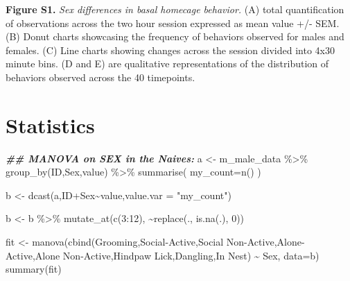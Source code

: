 \documentclass[
]{book}
\newenvironment{Shaded}{\begin{snugshade}}{\end{snugshade}}
\newcommand{\AttributeTok}[1]{\textcolor[rgb]{0.77,0.63,0.00}{#1}}
\newcommand{\DecValTok}[1]{\textcolor[rgb]{0.00,0.00,0.81}{#1}}
\newcommand{\DocumentationTok}[1]{\textcolor[rgb]{0.56,0.35,0.01}{\textbf{\textit{#1}}}}
\newcommand{\FunctionTok}[1]{\textcolor[rgb]{0.00,0.00,0.00}{#1}}
\newcommand{\NormalTok}[1]{#1}
\newcommand{\OtherTok}[1]{\textcolor[rgb]{0.56,0.35,0.01}{#1}}
\newcommand{\SpecialCharTok}[1]{\textcolor[rgb]{0.00,0.00,0.00}{#1}}
\newcommand{\StringTok}[1]{\textcolor[rgb]{0.31,0.60,0.02}{#1}}
\begin{document}
\textbf{Figure S1.} \emph{Sex differences in basal homecage behavior.} (A) total quantification of observations across the two hour session expressed as mean value +/- SEM. (B) Donut charts showcasing the frequency of behaviors observed for males and females. (C) Line charts showing changes across the session divided into 4x30 minute bins. (D and E) are qualitative representations of the distribution of behaviors observed across the 40 timepoints.

\hypertarget{statistics-2}{%
\section*{Statistics}\label{statistics-2}}

\begin{Shaded}
\begin{Highlighting}[]
\DocumentationTok{\#\# MANOVA on SEX in the Naives: }
\NormalTok{a }\OtherTok{\textless{}{-}}\NormalTok{ m\_male\_data }\SpecialCharTok{\%\textgreater{}\%}
  \FunctionTok{group\_by}\NormalTok{(ID,Sex,value) }\SpecialCharTok{\%\textgreater{}\%}
  \FunctionTok{summarise}\NormalTok{(}
    \AttributeTok{my\_count=}\FunctionTok{n}\NormalTok{()}
\NormalTok{  ) }
  
\NormalTok{b }\OtherTok{\textless{}{-}} \FunctionTok{dcast}\NormalTok{(a,ID}\SpecialCharTok{+}\NormalTok{Sex}\SpecialCharTok{\textasciitilde{}}\NormalTok{value,}\AttributeTok{value.var =} \StringTok{"my\_count"}\NormalTok{)}

\NormalTok{b }\OtherTok{\textless{}{-}}\NormalTok{ b }\SpecialCharTok{\%\textgreater{}\%} 
  \FunctionTok{mutate\_at}\NormalTok{(}\FunctionTok{c}\NormalTok{(}\DecValTok{3}\SpecialCharTok{:}\DecValTok{12}\NormalTok{), }\SpecialCharTok{\textasciitilde{}}\FunctionTok{replace}\NormalTok{(., }\FunctionTok{is.na}\NormalTok{(.), }\DecValTok{0}\NormalTok{))}

\NormalTok{fit }\OtherTok{\textless{}{-}} \FunctionTok{manova}\NormalTok{(}\FunctionTok{cbind}\NormalTok{(Grooming,}\StringTok{\textasciigrave{}}\AttributeTok{Social{-}Active}\StringTok{\textasciigrave{}}\NormalTok{,}\StringTok{\textasciigrave{}}\AttributeTok{Social Non{-}Active}\StringTok{\textasciigrave{}}\NormalTok{,}\StringTok{\textasciigrave{}}\AttributeTok{Alone{-}Active}\StringTok{\textasciigrave{}}\NormalTok{,}\StringTok{\textasciigrave{}}\AttributeTok{Alone Non{-}Active}\StringTok{\textasciigrave{}}\NormalTok{,}\StringTok{\textasciigrave{}}\AttributeTok{Hindpaw Lick}\StringTok{\textasciigrave{}}\NormalTok{,}\StringTok{\textasciigrave{}}\AttributeTok{Dangling}\StringTok{\textasciigrave{}}\NormalTok{,}\StringTok{\textasciigrave{}}\AttributeTok{In Nest}\StringTok{\textasciigrave{}}\NormalTok{) }\SpecialCharTok{\textasciitilde{}}\NormalTok{ Sex, }\AttributeTok{data=}\NormalTok{b)}
\FunctionTok{summary}\NormalTok{(fit)}
\end{Highlighting}
\end{Shaded}
\end{document}

